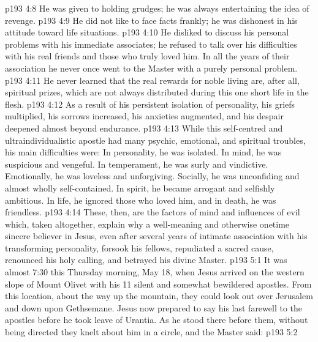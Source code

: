 \vs p193 4:8 \bibnobreakspace He was given to holding grudges; he was always entertaining the idea of revenge.
\vs p193 4:9 \bibnobreakspace He did not like to face facts frankly; he was dishonest in his attitude toward life situations.
\vs p193 4:10 \bibnobreakspace He disliked to discuss his personal problems with his immediate associates; he refused to talk over his difficulties with his real friends and those who truly loved him. In all the years of their association he never once went to the Master with a purely personal problem.
\vs p193 4:11 \bibnobreakspace He never learned that the real rewards for noble living are, after all, spiritual prizes, which are not always distributed during this one short life in the flesh.
\vs p193 4:12 \pc As a result of his persistent isolation of personality, his griefs multiplied, his sorrows increased, his anxieties augmented, and his despair deepened almost beyond endurance.
\vs p193 4:13 While this self\hyp{}centred and ultraindividualistic apostle had many psychic, emotional, and spiritual troubles, his main difficulties were: In personality, he was isolated. In mind, he was suspicious and vengeful. In temperament, he was surly and vindictive. Emotionally, he was loveless and unforgiving. Socially, he was unconfiding and almost wholly self\hyp{}contained. In spirit, he became arrogant and selfishly ambitious. In life, he ignored those who loved him, and in death, he was friendless.
\vs p193 4:14 These, then, are the factors of mind and influences of evil which, taken altogether, explain why a well\hyp{}meaning and otherwise onetime sincere believer in Jesus, even after several years of intimate association with his transforming personality, forsook his fellows, repudiated a sacred cause, renounced his holy calling, and betrayed his divine Master.
\vs p193 5:1 It was almost 7:30 this Thursday morning, May 18, when Jesus arrived on the western slope of Mount Olivet with his 11 silent and somewhat bewildered apostles. From this location, about  the way up the mountain, they could look out over Jerusalem and down upon Gethsemane. Jesus now prepared to say his last farewell to the apostles before he took leave of Urantia. As he stood there before them, without being directed they knelt about him in a circle, and the Master said:
\vs p193 5:2 \pc {}
